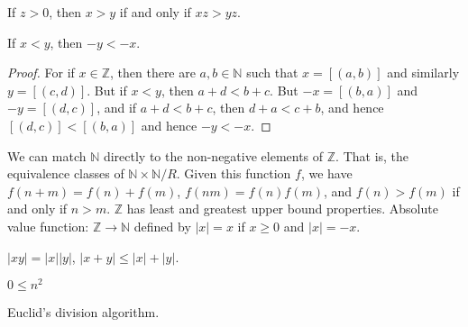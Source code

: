         \begin{theorem}
            If $z>0$, then $x>y$ if and only if $xz>yz$.
        \end{theorem}
        \begin{theorem}
            If $x<y$, then $\minus{y}<\minus{x}$.
        \end{theorem}
        \begin{proof}
            For if $x\in\mathbb{Z}$, then there are $a,b\in\mathbb{N}$ such
            that $x=[(a,b)]$ and similarly $y=[(c,d)]$. But if
            $x<y$, then $a+d<b+c$. But $\minus{x}=[(b,a)]$ and
            $\minus{y}=[(d,c)]$, and if $a+d<b+c$, then $d+a<c+b$, and hence
            $[(d,c)]<[(b,a)]$ and hence $\minus{y}<\minus{x}$.
        \end{proof}
        We can match $\mathbb{N}$ directly to the non-negative elements of
        $\mathbb{Z}$. That is, the equivalence classes of
        $\mathbb{N}\times\mathbb{N}/R$. Given this function $f$, we have
        $f(n+m)=f(n)+f(m)$, $f(nm)=f(n)f(m)$, and $f(n)>f(m)$ if and only if
        $n>m$. $\mathbb{Z}$ has least and greatest upper bound properties.
        Absolute value function: $\mathbb{Z}\rightarrow\mathbb{N}$ defined
        by $|x|=x$ if $x\geq{0}$ and $|x|=\minus{x}$.
        \begin{theorem}
            $|xy|=|x||y|$, $|x+y|\leq|x|+|y|$.
        \end{theorem}
        \begin{theorem}
            $0\leq{n}^{2}$
        \end{theorem}
        Euclid's division algorithm.
